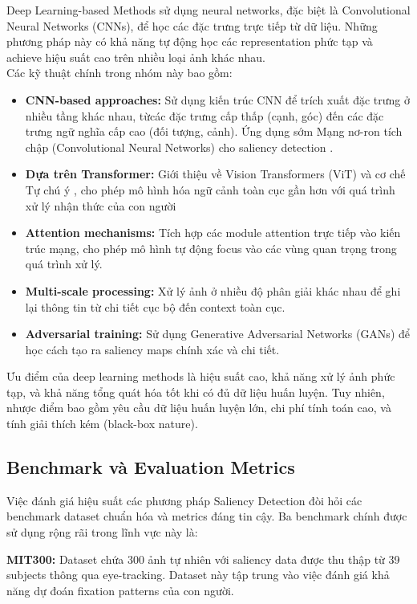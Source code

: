 Deep Learning-based Methods sử dụng neural networks, đặc biệt là Convolutional Neural Networks (CNNs), để học các đặc trưng trực tiếp từ dữ liệu. Những phương pháp này có khả năng tự động học các representation phức tạp và achieve hiệu suất cao trên nhiều loại ảnh khác nhau. \\
Các kỹ thuật chính trong nhóm này bao gồm:
\begin{itemize}
    \item \textbf{CNN-based approaches:} Sử dụng kiến trúc CNN để trích xuất đặc trưng ở nhiều tầng khác nhau, từcác đặc trưng cấp thấp (cạnh, góc) đến các đặc trưng ngữ nghĩa cấp cao (đối tượng, cảnh). Ứng dụng sớm Mạng nơ-ron tích chập (Convolutional Neural Networks) cho saliency detection \cite{wang2017saliency, u2net_2020}.
    \item \textbf{Dựa trên Transformer:} Giới thiệu về Vision Transformers (ViT) \cite{dosovitskiy2020image} và cơ chế Tự chú ý \cite{huang2022ssit}, cho phép mô hình hóa ngữ cảnh toàn cục gần hơn với quá trình xử lý nhận thức của con người
    \item \textbf{Attention mechanisms:} Tích hợp các module attention trực tiếp vào kiến trúc mạng, cho phép mô hình tự động focus vào các vùng quan trọng trong quá trình xử lý.
    \item \textbf{Multi-scale processing:} Xử lý ảnh ở nhiều độ phân giải khác nhau để ghi lại thông tin từ chi tiết cục bộ đến context toàn cục. 
    \item \textbf{Adversarial training:} Sử dụng Generative Adversarial Networks (GANs) để học cách tạo ra saliency maps chính xác và chi tiết.
\end{itemize}

Ưu điểm của deep learning methods là hiệu suất cao, khả năng xử lý ảnh phức tạp, và khả năng tổng quát hóa tốt khi có đủ dữ liệu huấn luyện. Tuy nhiên, nhược điểm bao gồm yêu cầu dữ liệu huấn luyện lớn, chi phí tính toán cao, và tính giải thích kém (black-box nature).

\subsection{Benchmark và Evaluation Metrics}

Việc đánh giá hiệu suất các phương pháp Saliency Detection đòi hỏi các benchmark dataset chuẩn hóa và metrics đáng tin cậy. Ba benchmark chính được sử dụng rộng rãi trong lĩnh vực này là:

\textbf{MIT300:} Dataset chứa 300 ảnh tự nhiên với saliency data được thu thập từ 39 subjects thông qua eye-tracking. Dataset này tập trung vào việc đánh giá khả năng dự đoán fixation patterns của con người.

